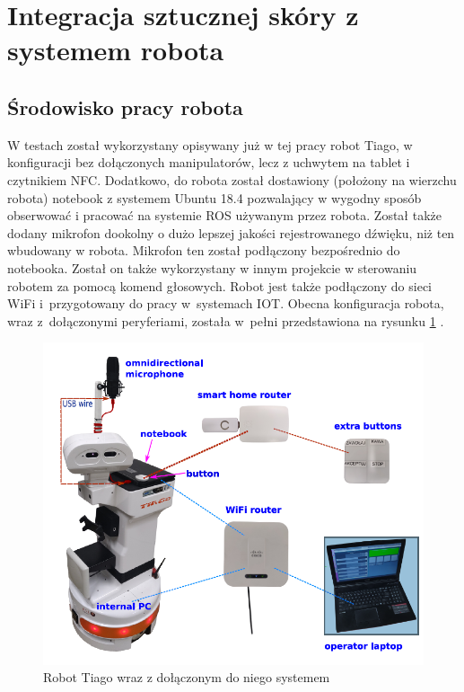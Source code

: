 \newpage
\section{Integracja sztucznej skóry z systemem robota}
\label{s_integracja}

\subsection{Środowisko pracy robota}

W testach został wykorzystany opisywany już w tej pracy robot Tiago, w konfiguracji bez dołączonych manipulatorów, lecz z uchwytem na tablet i czytnikiem NFC. Dodatkowo, do robota został dostawiony (położony na wierzchu robota) notebook z systemem Ubuntu 18.4 pozwalający w wygodny sposób obserwować i pracować na systemie ROS używanym przez robota. Został także dodany mikrofon dookolny o dużo lepszej jakości rejestrowanego dźwięku, niż ten wbudowany w robota. Mikrofon ten został podłączony bezpośrednio do notebooka. Został on także wykorzystany w innym projekcie w sterowaniu robotem za pomocą komend głosowych. Robot jest także podłączony do sieci WiFi i~przygotowany do pracy w~systemach IOT. Obecna konfiguracja robota, wraz z~dołączonymi peryferiami, została w~pełni przedstawiona na rysunku \ref{f_tiago_system} \cite{b_unpublic_system_lab}. 

\begin{figure}[!h]
    \centering 
    \includegraphics[width=0.9\linewidth]{img/tiago_system_lab.png}
    \caption{Robot Tiago wraz z dołączonym do niego systemem \cite{b_unpublic_system_lab}}
    \label{f_tiago_system}
\end{figure}

